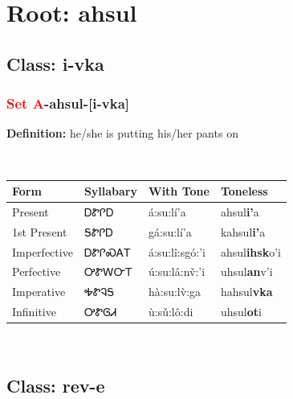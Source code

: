 \needspace{4in}
\section*{Root: ahsul}
\nopagebreak
{}
\needspace{3in}
\subsection*{Class: i-vka}
\nopagebreak
\needspace{2in}
\subsubsection*{\textcolor{Red}{Set A}{-}\textbf{ahsul}{-}[i-vka]}
\nopagebreak
\textbf{Definition: } he/she is putting his/her pants on
\\[0.5em]
\begin{tabularx}{\textwidth}{l X X X}%
\toprule%
\textbf{Form}&\textbf{Syllabary}&\textbf{With Tone}&\textbf{Toneless}\\%
\midrule%
Present&ᎠᏑᎵᎠ&á:su:lí’a&ahsul\textbf{i'}a\\%
1st Present&ᎦᏑᎵᎠ&gá:su:lí’a&kahsul\textbf{i'}a\\%
Imperfective&ᎠᏑᎵᏍᎪᎢ&á:su:lî:sgó:’i&ahsul\textbf{ihsk}o'i\\%
Perfective&ᎤᏑᎳᏅᎢ&ú:su:lâ:nv̌:’i&uhsul\textbf{an}v'i\\%
Imperative&ᎭᏑᎸᎦ&hà:su:lv̀:ga&hahsul\textbf{vka}\\%
Infinitive&ᎤᏑᎶᏗ&ù:sǔ:lô:di&uhsul\textbf{ot}i\\%
\bottomrule%
\end{tabularx}
\\[1em]
\needspace{3in}
\subsection*{Class: rev-e}
\nopagebreak
\needspace{2in}
